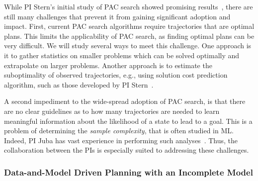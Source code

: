 \documentclass[12pt]{article}
\begin{document}

While PI Stern's initial study of PAC search showed promising results~\cite{stern2011probably,stern2012search}, there are still many challenges that prevent it from gaining significant adoption and impact. First, current PAC search algorithms require trajectories that are optimal plans. This limits the applicability of PAC search, as finding optimal plans can be very difficult. We will study several ways to meet this challenge. One approach is it to gather statistics on smaller problems which can be solved optimally and extrapolate on larger problems. Another approach is to estimate the suboptimality of observed trajectories, e.g., using solution cost prediction algorithm, such as those developed by PI Stern~\cite{lelis2016predicting,lelis2011predicting}. 



A second impediment to the wide-spread adoption of PAC search, is that there are no clear guidelines as to how many trajectories are needed to learn meaningful information about the likelihood of a state to lead to a goal. This is a problem of determining the {\em sample complexity}, that is often studied in ML. Indeed, PI Juba has vast experience in performing such analyses~\cite{goldreich2012theory,juba2013ijcai,juba2016jmlr,juba2016aaai,zhang2017aaai}. Thus, the collaboration between the PIs is especially suited to addressing these challenges. 






\subsubsection{Data-and-Model Driven Planning with an Incomplete Model}
\end{document}

